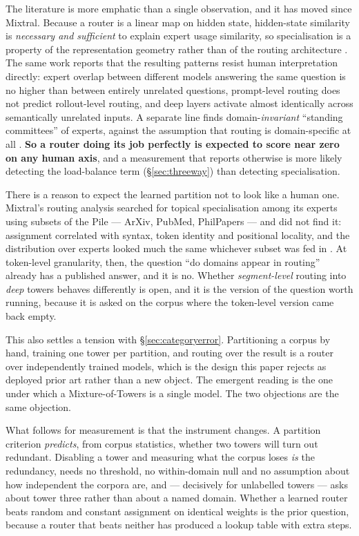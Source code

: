 \documentclass[11pt]{article}
\begin{document}
The literature is more emphatic than a single observation, and it has moved since Mixtral. Because a router is a linear map on hidden state, hidden-state similarity is \emph{necessary and sufficient} to explain expert usage similarity, so specialisation is a property of the representation geometry rather than of the routing architecture \cite{myth2026}. The same work reports that the resulting patterns resist human interpretation directly: expert overlap between different models answering the same question is no higher than between entirely unrelated questions, prompt-level routing does not predict rollout-level routing, and deep layers activate almost identically across semantically unrelated inputs. A separate line finds domain-\emph{invariant} ``standing committees'' of experts, against the assumption that routing is domain-specific at all \cite{illusion2026}. \textbf{So a router doing its job perfectly is expected to score near zero on any human axis}, and a measurement that reports otherwise is more likely detecting the load-balance term (\S\ref{sec:threeway}) than detecting specialisation.

There is a reason to expect the learned partition not to look like a human one. Mixtral's routing analysis searched for topical specialisation among its experts using subsets of the Pile --- ArXiv, PubMed, PhilPapers --- and did not find it: assignment correlated with syntax, token identity and positional locality, and the distribution over experts looked much the same whichever subset was fed in \cite{jiang2024mixtral}. At token-level granularity, then, the question ``do domains appear in routing'' already has a published answer, and it is no. Whether \emph{segment-level} routing into \emph{deep} towers behaves differently is open, and it is the version of the question worth running, because it is asked on the corpus where the token-level version came back empty.

This also settles a tension with \S\ref{sec:categoryerror}. Partitioning a corpus by hand, training one tower per partition, and routing over the result is a router over independently trained models, which is the design this paper rejects as deployed prior art rather than a new object. The emergent reading is the one under which a Mixture-of-Towers is a single model. The two objections are the same objection.

What follows for measurement is that the instrument changes. A partition criterion \emph{predicts}, from corpus statistics, whether two towers will turn out redundant. Disabling a tower and measuring what the corpus loses \emph{is} the redundancy, needs no threshold, no within-domain null and no assumption about how independent the corpora are, and --- decisively for unlabelled towers --- asks about tower three rather than about a named domain. Whether a learned router beats random and constant assignment on identical weights is the prior question, because a router that beats neither has produced a lookup table with extra steps.
\end{document}
